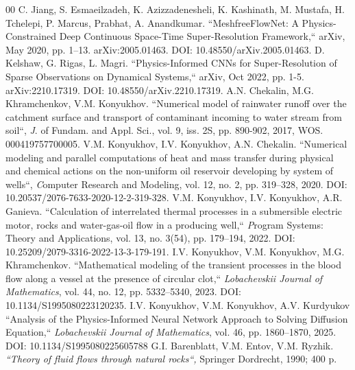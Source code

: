 \documentclass{ieeeaccess}
\begin{document}
{\begin{thebibliography}{00}
C. Jiang, S. Esmaeilzadeh, K. Azizzadenesheli, K. Kashinath, M. Mustafa, H. Tchelepi, P. Marcus, Prabhat, A. Anandkumar.
``MeshfreeFlowNet: A Physics-Constrained Deep Continuous Space-Time Super-Resolution Framework,`` arXiv, May 2020, pp. 1–13.
arXiv:2005.01463.
DOI: 10.48550/arXiv.2005.01463.
  D. Kelshaw, G. Rigas, L. Magri.
``Physics-Informed CNNs for Super-Resolution of Sparse Observations on Dynamical Systems,``  arXiv, Oct 2022, pp. 1-5.
arXiv:2210.17319.
DOI: 10.48550/arXiv.2210.17319.
A.N. Chekalin,  M.G. Khramchenkov,  V.M. Konyukhov.  
``Numerical model of rainwater runoff over the catchment surface and transport of contaminant incoming to water stream from soil``, 
 {\emph J. of Fundam. and Appl. Sci.}, 
 vol. 9,  iss. 2S, pp. 890-902, 2017,
   WOS. 000419757700005.
V.M. Konyukhov,  I.V. Konyukhov, A.N.  Chekalin.  
``Numerical modeling and parallel computations of heat and mass transfer during physical and chemical actions on the non-uniform oil reservoir developing by system of wells``,  
{\emph Computer Research and Modeling},  
 vol. 12, no. 2, pp. 319–328, 2020.
 DOI: 10.20537/2076-7633-2020-12-2-319-328.
V.M. Konyukhov,  I.V. Konyukhov,  A.R.  Ganieva. 
``Calculation of interrelated thermal processes in a submersible electric motor, rocks and water-gas-oil flow in a producing well,`` 
{\emph Program Systems: Theory and Applications},  
 vol. 13, no. 3(54), pp. 179–194, 2022.
 DOI: 10.25209/2079-3316-2022-13-3-179-191.
I.V. Konyukhov,  V.M. Konyukhov,  M.G. Khramchenkov.  
``Mathematical modeling of the transient processes in the blood flow along a vessel at the presence of circular clot,`` 
\emph{Lobachevskii Journal of Mathematics}, vol. 44, no. 12, pp. 5332–5340, 2023.
DOI: 10.1134/S1995080223120235.
I.V. Konyukhov, V.M. Konyukhov, A.V. Kurdyukov 
``Analysis of the Physics-Informed Neural Network Approach to Solving Diffusion Equation,`` \emph{Lobachevskii Journal of Mathematics}, vol. 46, pp. 1860–1870, 2025.
DOI: 10.1134/S1995080225605788
G.I. Barenblatt, V.M. Entov, V.M. Ryzhik.
\textit {``Theory of fluid flows through natural rocks``,} Springer Dordrecht, 1990; 400 p.


\end{thebibliography}}
\end{document}
